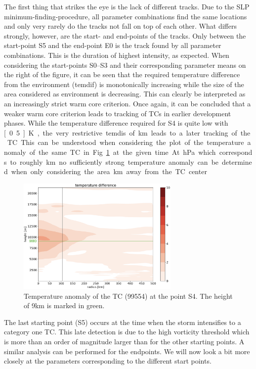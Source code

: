 The first thing that strikes the eye is the lack of different tracks. Due to the SLP minimum-finding-procedure, all parameter combinations find the same locations and only very rarely do the tracks not fall on top of each other.   What differs strongly, however, are the start- and end-points of the tracks. Only between the start-point S5 and the end-point E0 is the track found by all parameter combinations. This is the duration of highest intensity, as expected.\newline
When considering the start-points S0--S3 and their corresponding parameter means on the right of the figure, it can be seen that the required temperature difference from the environment (temdif) is monotonically increasing while the size of the area considered as environment is decreasing. This can clearly be interpreted as an increasingly strict warm core criterion. Once again, it can be concluded that a weaker warm core criterion leads to tracking of TCs in earlier development phases. \newline
While the temperature difference required for S4 is quite low with \unit[0.5]{K}, the very restrictive temdis of \unit[100]{km} leads to a later tracking of the TC. This can be understood when considering the plot of the temperature anomaly of the same TC in Fig.~\ref{fig:tc-temp-anomaly} at the given time. At \unit[300]{hPa} which corresponds to roughly \unit[9]{km} no sufficiently strong temperature anomaly can be determined when only considering the area \unit[100]{km} away from the TC center.\newline
\begin{figure}[!htb]
	\centering
	\includegraphics[width=0.7\textwidth]{img/0299554_S4temp20130902T060000Z_redo.png}
	\caption{Temperature anomaly of the TC (99554) at the point S4. The height of 9km is marked in green.}
	\label{fig:tc-temp-anomaly}
\end{figure}
The last starting point (S5) occurs at the time when the storm intensifies to a category one TC. This late detection is due to the high vorticity threshold which is more than an order of magnitude larger than for the other starting points. \newline
A similar analysis can be performed for the endpoints. We will now look a bit more closely at the parameters corresponding to the different start points.

